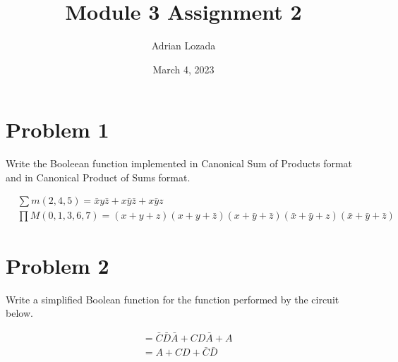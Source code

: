 \documentclass{article}
\author{Adrian Lozada}
\title{Module 3 Assignment 2}
\date{March 4, 2023}
\begin{document}
    \maketitle
    \newpage
    \section{Problem 1}
    \begin{flushleft}
        Write the Booleean function implemented in Canonical Sum of Products format
        and in Canonical Product of Sums format.
    \end{flushleft}
    \begin{align*}
        &\sum m(2, 4, 5) = \bar{x}y\bar{z} + x\bar{y}\bar{z} + x\bar{y}z \\
        &\prod M(0, 1, 3, 6, 7) = (x + y + z)(x + y + \bar{z})(x + \bar{y} + \bar{z})(\bar{x} + \bar{y} + z)(\bar{x} + \bar{y} + \bar{z})
    \end{align*}
    \section{Problem 2}
    \begin{flushleft}
        Write a simplified Boolean function for the function performed by the circuit below.
    \end{flushleft}
    \begin{align*}
        &= \bar{C}\bar{D}\bar{A} + CD\bar{A} + A \\
        &= A + CD + \bar{C}\bar{D}
    \end{align*}
\end{document}
